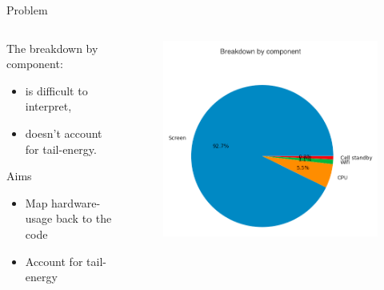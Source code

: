 %
%
\begin{frame}{Problem}
\begin{columns}
\begin{column}{0.5\textwidth}
The breakdown by component:
\begin{itemize}
\item is \alert{difficult to interpret},
\item doesn't account for \alert{tail-energy}.
\end{itemize}
\begin{block}{Aims}
\begin{itemize}
\item Map hardware-usage back to the code
\item Account for tail-energy
\end{itemize}
\end{block}
\end{column}
\begin{column}{0.5\textwidth}
\begin{figure}
	\includegraphics[width=\textwidth]{figures/hw_breakdown.png} 
\end{figure}
\end{column}
\end{columns}
\end{frame}
%
%
